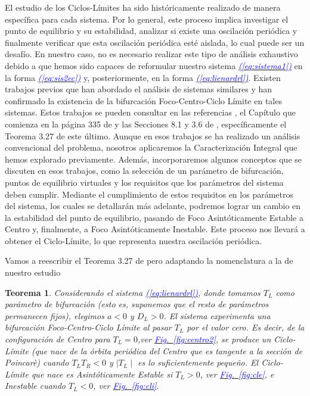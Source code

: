 \documentclass[12pt,a4paper]{report} %
\newtheorem{theorem}{Teorema}[chapter]
\newcommand{\fref}[1]{\hyperref[#1]{\textcolor{blue}{\textit{Fig.~\ref*{#1}}}}}
\newcommand{\eref}[1]{\hyperref[#1]{\textcolor{blue}{\textit{(\ref*{#1})}}}}
\begin{document}
	\vspace{0.5cm}El estudio de los Ciclos-Límites ha sido históricamente realizado de manera específica para cada sistema. Por lo general, este proceso implica investigar el punto de equilibrio y su estabilidad, analizar si existe una oscilación periódica y finalmente verificar que esta oscilación periódica esté aislada, lo cual puede ser un desafío. En nuestro caso, no es necesario realizar este tipo de análisis exhaustivo debido a que hemos sido capaces de reformular nuestro sistema \eref{eq:sistema1} en la forma \eref{eq:sis2ec} y, posteriormente, en la forma \eref{eq:lienardrl}. Existen trabajos previos que han abordado el análisis de sistemas similares y han confirmado la existencia de la bifurcación Foco-Centro-Ciclo Límite en tales sistemas. Estos trabajos se pueden consultar en las referencias \cite{ponce}, el Capítulo que comienza en la página 335 de \cite{ciclolimite} y las Secciones 8.1 y 3.6 de \cite{amarillo}, específicamente el Teorema 3.27 de este último. Aunque en esos trabajos se ha realizado un análisis convencional del problema, nosotros aplicaremos la Caracterización Integral que hemos explorado previamente. Además, incorporaremos algunos conceptos que se discuten en esos trabajos, como la selección de un parámetro de bifurcación, puntos de equilibrio virtuales y los requisitos que los parámetros del sistema deben cumplir. Mediante el cumplimiento de estos requisitos en los parámetros del sistema, los cuales se detallarán más adelante, podremos lograr un cambio en la estabilidad del punto de equilibrio, pasando de Foco Asintóticamente Estable a Centro y, finalmente, a Foco Asintóticamente Inestable. Este proceso nos llevará a obtener el Ciclo-Límite, lo que representa nuestra oscilación periódica.
	
	\newpage
	
	\vspace{0.5cm} Vamos a reescribir el Teorema 3.27 de \cite{amarillo} pero adaptando la nomenclatura a la de nuestro estudio
	
	\begin{theorem}
		\label{teo:5.1}
		Considerando el sistema \eref{eq:lienardrl}, donde tomamos $T_L$ como parámetro de bifurcación (esto es, suponemos que el resto de parámetros permanecen fijos), elegimos $a<0$ y $D_L>0$. El sistema experimenta una bifurcación Foco-Centro-Ciclo Límite al pasar $T_L$ por el valor cero. Es decir, de la configuración de Centro para $T_L=0$,ver \fref{fig:centro2}, se produce un Ciclo-Límite (que nace de la órbita periódica del Centro que es tangente a la sección de Poincarè) cuando $T_L T_R<0$ y $\mid T_L \mid$ es lo suficientemente pequeño. El Ciclo-Límite que nace es Asintóticamente Estable si $T_L>0$, ver \fref{fig:cle}, e Inestable cuando $T_L<0$, ver \fref{fig:cli}.
	\end{theorem}
	
\end{document}
